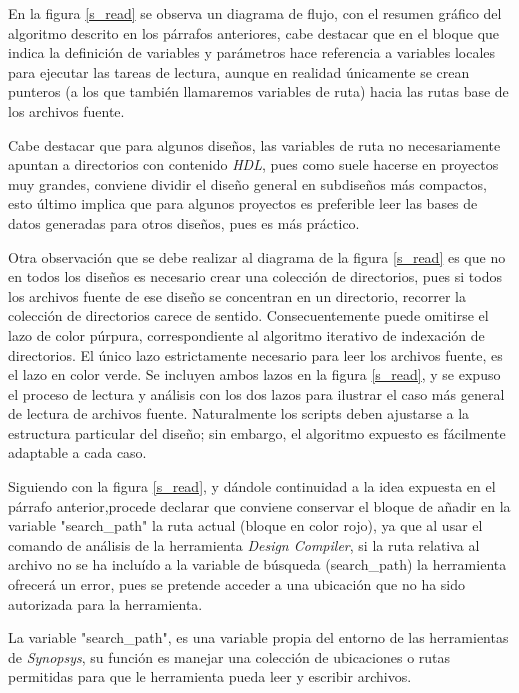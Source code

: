 En la figura \ref{s_read} se observa un diagrama de flujo, con el resumen gráfico del algoritmo descrito en los párrafos anteriores, cabe destacar que en el bloque que indica la definición de variables y parámetros hace referencia a variables locales para ejecutar las tareas de lectura, aunque en realidad únicamente se crean punteros (a los que también llamaremos variables de ruta) hacia las rutas base de los archivos fuente.

Cabe destacar que para algunos diseños, las variables de ruta no necesariamente apuntan a directorios con contenido \textit{HDL}, pues como suele hacerse en proyectos muy grandes, conviene dividir el diseño general en subdiseños más compactos, esto último implica que para algunos proyectos es preferible leer las bases de datos generadas para otros diseños, pues es más práctico.

Otra observación que se debe realizar al diagrama de la figura \ref{s_read} es que no en todos los diseños es necesario crear una colección de directorios, pues si todos los archivos fuente de ese diseño se concentran en un directorio, recorrer la colección de directorios carece de sentido. Consecuentemente puede omitirse el lazo de color púrpura, correspondiente al algoritmo iterativo de indexación de directorios. El único lazo estrictamente necesario para leer los archivos fuente, es el lazo en color verde. Se incluyen ambos lazos en la figura \ref{s_read}, y se expuso el proceso de lectura y análisis con los dos lazos para ilustrar el caso más general de lectura de archivos fuente. Naturalmente los scripts deben ajustarse a la estructura particular del diseño; sin embargo, el algoritmo expuesto es fácilmente adaptable a cada caso.

Siguiendo con la figura \ref{s_read}, y dándole continuidad a la idea expuesta en el párrafo anterior,procede declarar que conviene conservar el bloque de añadir en la variable "search\_path" la ruta actual (bloque en color rojo), ya que al usar el comando de análisis de la herramienta \textit{Design Compiler}, si la ruta relativa al archivo no se ha incluído a la variable de búsqueda (search\_path) la herramienta ofrecerá un error, pues se pretende acceder a una ubicación que no ha sido autorizada para la herramienta.

La variable "search\_path", es una variable propia del entorno de las herramientas de \textit{Synopsys}, su función es manejar una colección de ubicaciones o rutas permitidas para que le herramienta pueda leer y escribir archivos.

